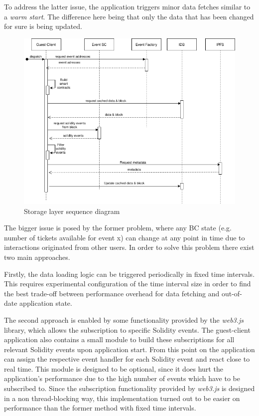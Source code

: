 To address the latter issue, the application triggers minor data fetches similar to a \textit{warm start}. The difference here being that only the data that has been changed for sure is being updated.

\begin{figure}[hbt]
    \centering
    \includegraphics[width=14cm]{images/storage_sequence.png}
    \caption{Storage layer sequence diagram}
    \label{fig:storage_sequence}
\end{figure}

The bigger issue is posed by the former problem, where any BC state (e.g. number of tickets available for event x) can change at any point in time due to interactions originated from other users. In order to solve this problem there exist two main approaches. 

Firstly, the data loading logic can be triggered periodically in fixed time intervals. This requires experimental configuration of the time interval size in order to find the best trade-off between performance overhead for data fetching and out-of-date application state. 

The second approach is enabled by some functionality provided by the \textit{web3.js} library, which allows the subscription to specific Solidity events. The guest-client application also contains a small module to build these subscriptions for all relevant Solidity events upon application start. From this point on the application can assign the respective event handler for each Solidity event and react close to real time. This module is designed to be optional, since it does hurt the application's performance due to the high number of events which have to be subscribed to. Since the subscription functionality provided by \textit{web3.js} is designed in a non thread-blocking way, this implementation turned out to be easier on performance than the former method with fixed time intervals.
